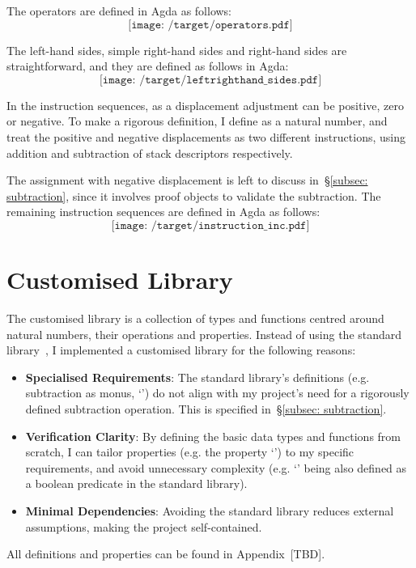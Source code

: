 \documentclass[12pt,a4paper]{report}
\theoremstyle{definition}
\newcommand{\secref}[1]{\S\ref{#1}}
\begin{document}
    The operators are defined in Agda as follows:
    \[\texttt{[image: /target/operators.pdf]}\]

    The left-hand sides, simple right-hand sides and right-hand sides are straightforward, and they are defined as follows in Agda:
    \[\texttt{[image: /target/leftrighthand\_sides.pdf]}\]

    In the instruction sequences, \text{\delta} as a displacement adjustment can be positive, zero or negative. To make a rigorous definition, I define \text{\delta} as a natural number, and treat the positive and negative displacements as two different instructions, using addition and subtraction of stack descriptors respectively. 

    The assignment with negative displacement is left to discuss in~\secref{subsec: subtraction}, since it involves proof objects to validate the subtraction. 
    The remaining instruction sequences are defined in Agda as follows:
    \[\texttt{[image: /target/instruction\_inc.pdf]}\]


    \section{Customised Library} \label{sec: lib}
    The customised library is a collection of types and functions centred around natural numbers, their operations and properties. Instead of using the standard library~\autocite{agda_std}, I implemented a customised library for the following reasons:
    \begin{itemize}
        \item
            \textbf{Specialised Requirements}: The standard library's definitions (e.g. subtraction as monus, `\text{\dotdiv}') do not align with my project's need for a rigorously defined subtraction operation. This is specified in~\secref{subsec: subtraction}.
        \item
            \textbf{Verification Clarity}: By defining the basic data types and functions from scratch, I can tailor properties (e.g. the property `') to my specific requirements, and avoid unnecessary complexity (e.g. `\text{\leq}' being also defined as a boolean predicate in the standard library). 
        \item
            \textbf{Minimal Dependencies}: Avoiding the standard library reduces external assumptions, making the project self-contained. 
    \end{itemize}
    All definitions and properties can be found in Appendix~[TBD].
\end{document}
